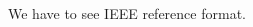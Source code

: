 \documentclass[12pt,a4]{article}
\begin{document}
%


\begin{thebibliography}{99}

We have to see IEEE reference format.
%
%


\end{thebibliography}
\end{document}
